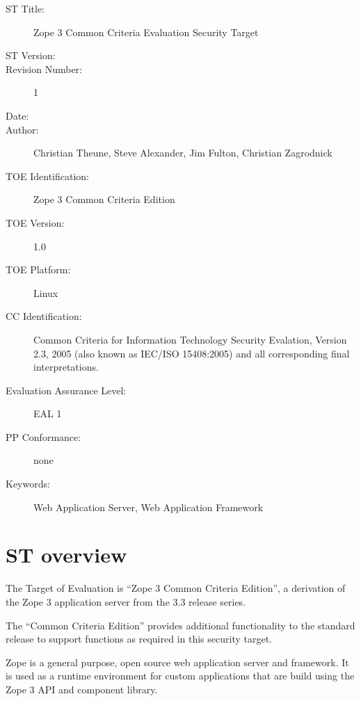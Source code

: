 \documentclass[12pt,english]{scrbook}
\begin{document}
\begin{description}

  \item[ST Title:] Zope 3 Common Criteria Evaluation Security Target

  \item[ST Version:] \svnInfoRevision

  \item[Revision Number:] 1

  \item[Date:] \svnInfoDate

  \item[Author:] Christian Theune, Steve Alexander, Jim Fulton, Christian Zagrodnick

  \item[TOE Identification:] Zope 3 Common Criteria Edition

  \item[TOE Version:] 1.0

  \item[TOE Platform:] Linux

  \item[CC Identification:] Common Criteria for Information Technology Security
  Evalation, Version 2.3, 2005 (also known as IEC/ISO 15408:2005) and all
  corresponding final interpretations.

  \item[Evaluation Assurance Level:] EAL 1

  \item[PP Conformance:] none

  \item[Keywords:] Web Application Server, Web Application Framework
\end{description}


\section{ST overview}

The Target of Evaluation is ``Zope 3 Common Criteria Edition'', a derivation
of the Zope 3 application server from the 3.3 release series.

The ``Common Criteria Edition'' provides additional functionality to the
standard release to support functions as required in this security target.

Zope is a general purpose, open source web application server and framework.
It is used as a runtime environment for custom applications that are build
using the Zope 3 API and component library.
\end{document}

